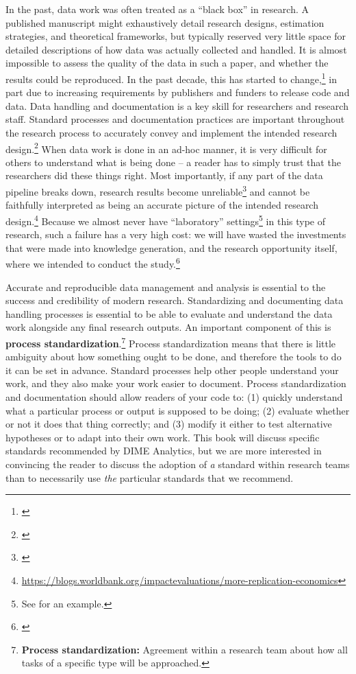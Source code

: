 In the past, data work was often treated as a ``black box'' in research.
A published manuscript might exhaustively detail
research designs, estimation strategies, and theoretical frameworks,
but typically reserved very little space for detailed descriptions
of how data was actually collected and handled.
It is almost impossible to assess the quality of the data in such a paper,
and whether the results could be reproduced.
In the past decade, this has started to change,\footnote{\cite{swanson2020research}}
in part due to increasing requirements by publishers and funders to release code and data.
Data handling and documentation is a key skill for researchers and research staff.
Standard processes and documentation practices
are important throughout the research process to accurately convey
and implement the intended research design.\footnote{\cite{vilhuber_lars_2020_3911311}}
When data work is done in an ad-hoc manner,
it is very difficult for others to understand what is being done --
a reader has to simply trust that the researchers did these things right.
Most importantly, if any part of the data pipeline breaks down,
research results become unreliable\footnote{ \cite{mccullough2008economics}}
and cannot be faithfully interpreted
as being an accurate picture of the intended research design.\footnote{
  \url{https://blogs.worldbank.org/impactevaluations/more-replication-economics}}
Because we almost never have ``laboratory'' settings\footnote{
  See \cite{baldwin2015elections} for an example.}
in this type of research,
such a failure has a very high cost:
we will have wasted the investments that were made into knowledge generation,
and the research opportunity itself,
where we intended to conduct the study.\footnote{\cite{camerer2016evaluating}}

Accurate and reproducible data management and analysis
is essential to the success and credibility of modern research.
Standardizing and documenting data handling processes is essential
to be able to evaluate and understand
the data work alongside any final research outputs.
An important component of this is \textbf{process standardization}.\footnote{
	\textbf{Process standardization:} Agreement within a research team
	about how all tasks of a specific type will be approached.}
Process standardization means that there is
little ambiguity about how something ought to be done,
and therefore the tools to do it can be set in advance.
Standard processes help other people understand your work,
and they also make your work easier to document.
Process standardization and documentation should allow readers of your code to:
(1) quickly understand what a particular process or output is supposed to be doing;
(2) evaluate whether or not it does that thing correctly; and
(3) modify it either to test alternative hypotheses or to adapt into their own work.
This book will discuss specific standards recommended by DIME Analytics,
but we are more interested in convincing the reader
to discuss the adoption of \textit{a} standard within research teams
than to necessarily use \textit{the} particular standards that we recommend.


